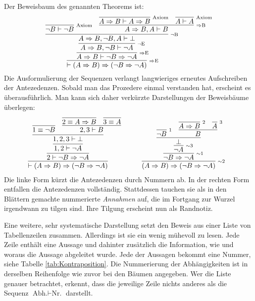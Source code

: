 Der Beweisbaum des genannten Theorems ist:
\[
\infer[\infernote{$\cond$E}]{\vdash (A\cond B)\cond (\lnot B\cond\lnot A)}{
  \infer[\infernote{$\cond$E}]{A\cond B\vdash \lnot B\cond\lnot A}{
    \infer[\infernote{$\lnot$E}]{A\cond B, \lnot B\vdash\lnot A}{
      \infer[\infernote{$\lnot$B}]{A\cond B, \lnot B, A\vdash\bot}{
        \infer[\infernote{Axiom}]{\lnot B\vdash\lnot B}{}
      & \infer[\infernote{$\cond$B}]{A\cond B, A\vdash B}{
          \infer[\infernote{Axiom}]{A\cond B\vdash A\cond B}{}
        & \infer[\infernote{Axiom}]{A\vdash A}{}}}}}}
\]
Die Ausformulierung der Sequenzen verlangt langwieriges erneutes
Aufschreiben der Antezedenzen. Sobald man das Prozedere einmal
verstanden hat, erscheint es überausführlich. Man kann sich daher
verkürzte Darstellungen der Beweisbäume überlegen:
\[
\begin{tabular}{@{}l@{\qquad\quad}l}
\infer{\vdash (A\cond B)\cond (\lnot B\cond\lnot A)}{
  \infer{2\vdash \lnot B\cond\lnot A}{
    \infer{1, 2\vdash\lnot A}{
      \infer{1, 2, 3\vdash\bot}{
        \infer{1\equiv\lnot B}{}
      & \infer{2, 3\vdash B}{
          \infer{2\equiv A\cond B}{}
        & \infer{3\equiv A}{}}}}}}
&
\infer[\infernote{$\sim$2}]{(A\cond B)\cond (\lnot B\cond\lnot A)}{
  \infer[\infernote{$\sim$1}]{\lnot B\cond\lnot A}{
    \infer[\infernote{$\sim$3}]{\lnot A}{
      \infer{\bot}{
        \infer[\infernote{1}]{\lnot B}{}
      & \infer{B}{
          \infer[\infernote{2}]{A\cond B}{}
        & \infer[\infernote{3}]{A}{}}}}}}
\end{tabular}
\]
Die linke Form kürzt die Antezedenzen durch Nummern ab. In der rechten
Form entfallen die Antezedenzen vollständig. Stattdessen tauchen sie
als in den Blättern gemachte nummerierte \emph{Annahmen} auf, die im
Fortgang zur Wurzel irgendwann zu tilgen sind. Ihre Tilgung erscheint
nun als Randnotiz.

Eine weitere, sehr systematische Darstellung setzt den Beweis aus
einer Liste von Tabellenzeilen zusammen. Allerdings ist sie ein wenig
mühevoll zu lesen. Jede Zeile enthält eine Aussage und dahinter
zusätzlich die Information, wie und woraus die Aussage abgeleitet wurde.
Jede der Aussagen bekommt eine Nummer, siehe Tabelle \ref{tab:Kontraposition}.
Die Nummerierung der Abhängigkeiten ist in derselben Reihenfolge wie
zuvor bei den Bäumen angegeben. Wer die Liste genauer betrachtet, erkennt,
dass die jeweilige Zeile nichts anderes als die Sequenz
$\text{Abh.}\vdash\text{Nr.}$ darstellt.

